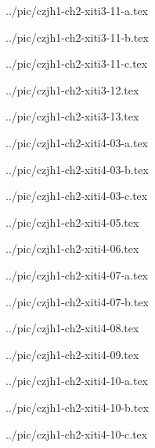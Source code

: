 

../pic/czjh1-ch2-xiti3-11-a.tex



../pic/czjh1-ch2-xiti3-11-b.tex



../pic/czjh1-ch2-xiti3-11-c.tex



../pic/czjh1-ch2-xiti3-12.tex



../pic/czjh1-ch2-xiti3-13.tex



../pic/czjh1-ch2-xiti4-03-a.tex



../pic/czjh1-ch2-xiti4-03-b.tex



../pic/czjh1-ch2-xiti4-03-c.tex



../pic/czjh1-ch2-xiti4-05.tex



../pic/czjh1-ch2-xiti4-06.tex



../pic/czjh1-ch2-xiti4-07-a.tex



../pic/czjh1-ch2-xiti4-07-b.tex



../pic/czjh1-ch2-xiti4-08.tex



../pic/czjh1-ch2-xiti4-09.tex



../pic/czjh1-ch2-xiti4-10-a.tex



../pic/czjh1-ch2-xiti4-10-b.tex



../pic/czjh1-ch2-xiti4-10-c.tex



